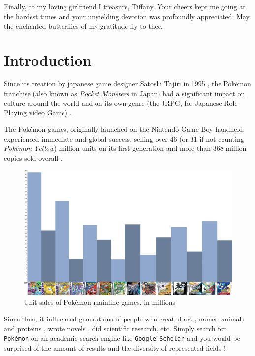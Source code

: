 \documentclass[11pt]{article}
\begin{document}
Finally, to my loving girlfriend I treasure, Tiffany. Your cheers kept me going at the hardest times and your unyielding devotion was profoundly appreciated. May the enchanted butterflies of my gratitude fly to thee.


\newpage
\section{Introduction}

Since its creation by japanese game designer  Satoshi Tajiri in 1995 \cite{PkmnCreator,SatoshiBook}, the Pokémon franchise (also known as \textit{Pocket Monsters} in Japan) had a significant impact on culture around the world \cite{PkmnPop,PkmnEffect} and on its own genre (the JRPG, for Japanese Role-Playing video Game) \cite{PkmnRPG}.

The Pokémon games, originally launched on the Nintendo Game Boy handheld, experienced immediate and global success, selling over 46 (or 31 if not counting \textit{Pokémon Yellow}) million units on its first generation \cite{PkmnSales} and more than 368 million copies sold overall \cite{PkmnFigures}.

\begin{figure}[!h]
	\centering
	\includegraphics[width=\textwidth]{Pokemon_sales_gen}
	\caption{Unit sales of Pokémon mainline games, in millions \cite{PkmnSales,PkmnSalesIll} }
\end{figure}

Since then, it influenced generations of people who created art \cite{PkmnArt}, named animals and proteins \cite{Pikachurin,Etymology}, wrote novels \cite{Novel}, did scientific research, etc. Simply search for \texttt{Pokémon} on an academic search engine like \texttt{Google Scholar} and you would be surprised of the amount of results and the diversity of represented fields !
\end{document}
